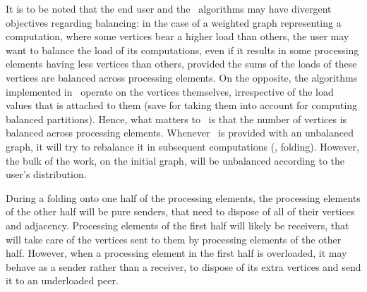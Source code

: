 It is to be noted that the end user and the \scotch\ algorithms may
have divergent objectives regarding balancing: in the case of a
weighted graph representing a computation, where some vertices bear a
higher load than others, the user may want to balance the load of its
computations, even if it results in some processing elements having
less vertices than others, provided the sums of the loads of these
vertices are balanced across processing elements. On the opposite, the
algorithms implemented in \scotch\ operate on the vertices themselves,
irrespective of the load values that is attached to them (save for
taking them into account for computing balanced partitions). Hence,
what matters to \scotch\ is that the number of vertices is balanced
across processing elements. Whenever \scotch\ is provided with an
unbalanced graph, it will try to rebalance it in subsequent
computations (\eg, folding). However, the bulk of the work, on the
initial graph, will be unbalanced according to the user's
distribution.

During a folding onto one half of the processing elements, the
processing elements of the other half will be pure
senders, that need to dispose of all of their vertices and
adjacency. Processing elements of the first half will likely be
receivers, that will take care of the vertices sent to them by
processing elements of the other half. However, when a processing
element in the first half is overloaded, it may behave as a
sender rather than a receiver, to dispose of its extra vertices and
send it to an underloaded peer.

